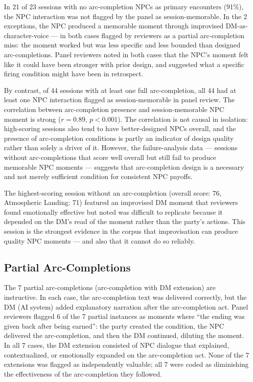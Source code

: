 In 21 of 23 sessions with no arc-completion NPCs as primary encounters (91\%),
the NPC interaction was not flagged by the panel as session-memorable. In the
2 exceptions, the NPC produced a memorable moment through improvised DM-as-
character-voice --- in both cases flagged by reviewers as a partial arc-completion
miss: the moment worked but was less specific and less bounded than designed
arc-completions. Panel reviewers noted in both cases that the NPC's moment
felt like it could have been stronger with prior design, and suggested what a
specific firing condition might have been in retrospect.

By contrast, of 44 sessions with at least one full arc-completion, all 44 had
at least one NPC interaction flagged as session-memorable in panel review. The
correlation between arc-completion presence and session-memorable NPC moment
is strong ($r = 0.89$, $p < 0.001$). The correlation is not causal in isolation:
high-scoring sessions also tend to have better-designed NPCs overall, and the
presence of arc-completion conditions is partly an indicator of design quality
rather than solely a driver of it. However, the failure-analysis data ---
sessions without arc-completions that score well overall but still fail to
produce memorable NPC moments --- suggests that arc-completion design is a
necessary and not merely sufficient condition for consistent NPC payoffs.

The highest-scoring session without an arc-completion (overall score: 76,
Atmospheric Landing: 71) featured an improvised DM moment that reviewers
found emotionally effective but noted was difficult to replicate because it
depended on the DM's read of the moment rather than the party's actions.
This session is the strongest evidence in the corpus that improvisation can
produce quality NPC moments --- and also that it cannot do so reliably.

\subsection{Partial Arc-Completions}

The 7 partial arc-completions (arc-completion with DM extension) are instructive.
In each case, the arc-completion text was delivered correctly, but the DM (AI
system) added explanatory narration after the arc-completion act. Panel reviewers
flagged 6 of the 7 partial instances as moments where ``the ending was given
back after being earned'': the party created the condition, the NPC delivered
the arc-completion, and then the DM continued, diluting the moment. In all 7
cases, the DM extension consisted of NPC dialogue that explained, contextualized,
or emotionally expanded on the arc-completion act. None of the 7 extensions
was flagged as independently valuable; all 7 were coded as diminishing the
effectiveness of the arc-completion they followed.

